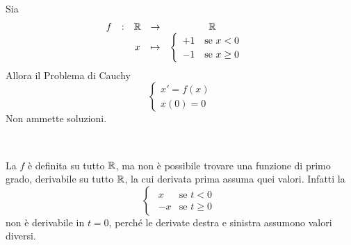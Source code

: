 \begin{example}
	Sia
	$$\begin{array}{ccccc} {f} & : & {\mathbb{R}} & \to & {\mathbb{R}} \\ & & {x} & \mapsto & {	\begin{cases}
						\begin{array}{ll}
							+1 & \text{se } x < 0\\
							-1 & \text{se } x \geq 0
						\end{array}
					\end{cases}} \\ \end{array}$$
	Allora il Problema di Cauchy
	$$\begin{cases}
		x'=f(x)\\
		x(0) = 0
	\end{cases}$$
	Non ammette soluzioni. %

	\begin{solution}
		~
		\begin{center}
		\end{center}
		La $f$ è definita su tutto $\mathbb{R}$, ma non è possibile trovare una funzione di primo grado, derivabile su tutto $\mathbb{R}$, la cui derivata prima assuma quei valori. Infatti la
		$$\begin{cases}
			\begin{array}{ll}
				x & \text{se } t < 0\\
				-x & \text{se } t \geq 0
			\end{array}
		\end{cases}$$
		non è derivabile in $t = 0$, perché le derivate destra e sinistra assumono valori diversi.
	\end{solution}
\end{example}
